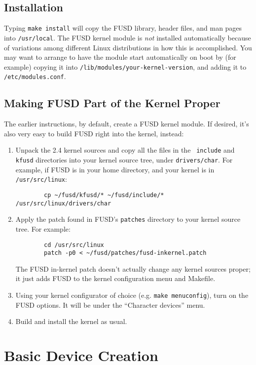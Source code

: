 \documentclass{article}
\begin{document}
\subsection{Installation}

Typing {\tt make install} will copy the FUSD library, header files,
and man pages into {\tt /usr/local}.  The FUSD kernel module is {\em
not} installed automatically because of variations among different
Linux distributions in how this is accomplished.  You may want to
arrange to have the module start automatically on boot by (for
example) copying it into {\tt /lib/modules/your-kernel-version}, and
adding it to {\tt /etc/modules.conf}.


\subsection{Making FUSD Part of the Kernel Proper}

The earlier instructions, by default, create a FUSD kernel module.
If desired, it's also very easy to build FUSD right into the kernel,
instead:
\begin{enumerate}
\item Unpack the 2.4 kernel sources and copy all the files in the {\tt
include} and {\tt kfusd} directories into your kernel source tree,
under {\tt drivers/char}.  For example, if FUSD is in
your home directory, and your kernel is in {\tt /usr/src/linux}:
\begin{verbatim}
        cp ~/fusd/kfusd/* ~/fusd/include/* /usr/src/linux/drivers/char
\end{verbatim}

\item Apply the patch found in FUSD's {\tt patches} directory to your
kernel source tree.  For example:
\begin{verbatim}
        cd /usr/src/linux
        patch -p0 < ~/fusd/patches/fusd-inkernel.patch
\end{verbatim}
The FUSD in-kernel patch doesn't actually change any kernel sources
proper; it just adds FUSD to the kernel configuration menu and
Makefile.
\item Using your kernel configurator of choice (e.g. {\tt make
menuconfig}), turn on the FUSD options.  It will be under the
``Character devices'' menu.
\item Build and install the kernel as usual.
\end{enumerate}


\section{Basic Device Creation}
\end{document}
